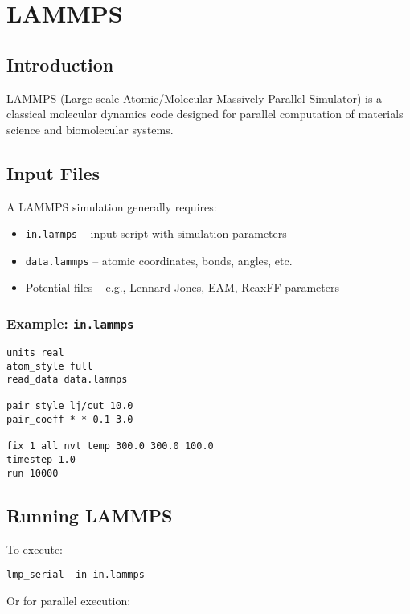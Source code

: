 
\chapter{LAMMPS}

\section{Introduction}

LAMMPS (Large-scale Atomic/Molecular Massively Parallel Simulator) is a classical molecular dynamics code designed for parallel computation of materials science and biomolecular systems.

\section{Input Files}

A LAMMPS simulation generally requires:

\begin{itemize}
    \item \texttt{in.lammps} – input script with simulation parameters
    \item \texttt{data.lammps} – atomic coordinates, bonds, angles, etc.
    \item Potential files – e.g., Lennard-Jones, EAM, ReaxFF parameters
\end{itemize}

\subsection*{Example: \texttt{in.lammps}}

\begin{verbatim}
units real
atom_style full
read_data data.lammps

pair_style lj/cut 10.0
pair_coeff * * 0.1 3.0

fix 1 all nvt temp 300.0 300.0 100.0
timestep 1.0
run 10000
\end{verbatim}

\section{Running LAMMPS}

To execute:

\begin{verbatim}
lmp_serial -in in.lammps
\end{verbatim}

Or for parallel execution:

